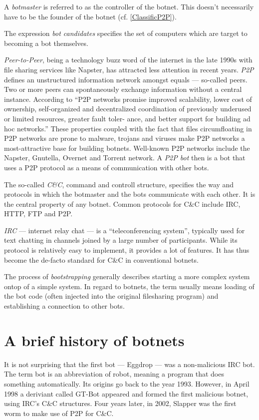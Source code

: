\documentclass{llncs}
\begin{document}
A {\it botmaster} is referred to as the controller of the botnet. This
doesn't necessarily have to be the founder of the botnet (cf. \ref{ClassificP2P}).

The expression {\it bot candidates} specifies the set of computers
which are target to becoming a bot themselves.

{\it Peer-to-Peer}, being a technology buzz word of the internet in
the late 1990s with file sharing services like Napster\cite{napster},
has attracted less attention in recent years. {\it P2P } defines an
unstructured information network amongst equals --- so-called
peers. Two or more peers can spontaneously exchange information
without a central instance. According to \cite{schoder2005core} ``P2P
networks promise improved scalability, lower cost of ownership,
self-organized and decentralized coordination of previously underused
or limited resources, greater fault toler- ance, and better support
for building ad hoc networks.''  These properties coupled with the
fact that files circumfloating in P2P networks are prone to malware,
trojans and viruses make P2P networks a most-attractive base for
building botnets.  Well-known P2P networks include the
Napster\cite{napster}, Gnutella, Overnet and Torrent network.  A {\it
  P2P bot} then is a bot that uses a P2P protocol as a means of
communication with other bots.

The so-called {\it C\&C}, command and controll structure, specifies
the way and protocols in which the botmaster and the bots communicate
with each other. It is the central property of any botnet. Common
protocols for C\&C include IRC, HTTP, FTP and P2P.\cite{borgaonkar2010analysis}

{\it IRC} --- internet relay chat --- is a ``teleconferencing
system''\cite{irc}, typically used for text chatting in channels
joined by a large number of participants. While its protocol is
relatively easy to implement, it provides a lot of features. It has
thus become the de-facto standard for C\&C in conventional botnets.

The process of {\it bootstrapping} generally describes starting a more
complex system ontop of a simple system. In regard to botnets, the
term usually means loading of the bot code (often injected into the
original filesharing program) and establishing a connection to other
bots.\cite{wang2009systematic}

\section{A brief history of botnets}
It is not surprising that the first bot --- Eggdrop --- was a
non-malicious IRC bot. The term bot is an abbreviation of robot,
meaning a program that does something automatically. Its origins go
back to the year 1993. However, in April 1998 a deriviant called
GT-Bot appeared and formed the first malicious botnet, using IRC's
C\&C structures. Four years later, in 2002, Slapper was the first worm
to make use of P2P for C\&C.\cite{li2009botnet}
\end{document}

